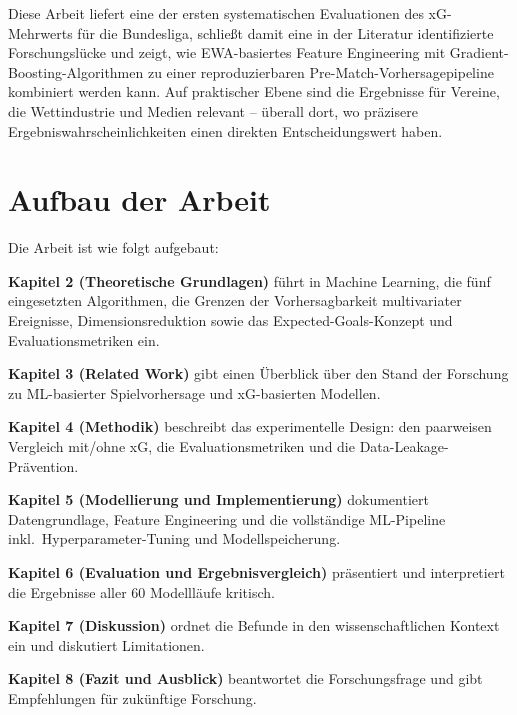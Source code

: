 Diese Arbeit liefert eine der ersten systematischen Evaluationen des
xG-Mehrwerts für die Bundesliga, schließt damit eine in der Literatur
identifizierte Forschungslücke \cite{VanEetveldeEtAl2024} und zeigt, wie
EWA-basiertes Feature Engineering mit Gradient-Boosting-Algorithmen
zu einer reproduzierbaren Pre-Match-Vorhersagepipeline kombiniert werden
kann. Auf praktischer Ebene sind die Ergebnisse für Vereine, die
Wettindustrie \cite{ForrestSimmons2000} und Medien relevant -- überall dort,
wo präzisere Ergebniswahrscheinlichkeiten einen direkten Entscheidungswert
haben.

\section{Aufbau der Arbeit}

Die Arbeit ist wie folgt aufgebaut:

\textbf{Kapitel 2 (Theoretische Grundlagen)} führt in Machine Learning,
die fünf eingesetzten Algorithmen, die Grenzen der Vorhersagbarkeit
multivariater Ereignisse, Dimensionsreduktion sowie das Expected-Goals-Konzept
und Evaluationsmetriken ein.

\textbf{Kapitel 3 (Related Work)} gibt einen Überblick über den Stand der
Forschung zu ML-basierter Spielvorhersage und xG-basierten Modellen.

\textbf{Kapitel 4 (Methodik)} beschreibt das experimentelle Design: den
paarweisen Vergleich mit/ohne xG, die Evaluationsmetriken und die
Data-Leakage-Prävention.

\textbf{Kapitel 5 (Modellierung und Implementierung)} dokumentiert
Datengrundlage, Feature Engineering und die vollständige ML-Pipeline
inkl.\ Hyperparameter-Tuning und Modellspeicherung.

\textbf{Kapitel 6 (Evaluation und Ergebnisvergleich)} präsentiert und
interpretiert die Ergebnisse aller 60 Modellläufe kritisch.

\textbf{Kapitel 7 (Diskussion)} ordnet die Befunde in den wissenschaftlichen
Kontext ein und diskutiert Limitationen.

\textbf{Kapitel 8 (Fazit und Ausblick)} beantwortet die Forschungsfrage
und gibt Empfehlungen für zukünftige Forschung.